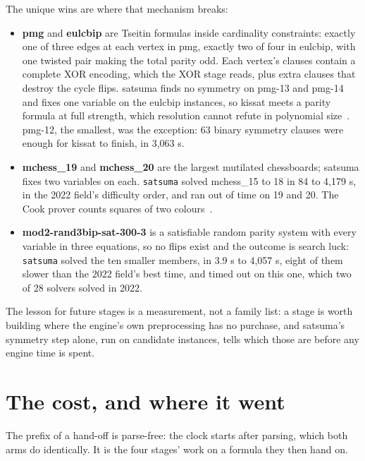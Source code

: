 \documentclass[10pt]{article}
\newcommand{\sats}{\texttt{satsuma}}
\begin{document}
The unique wins are where that mechanism breaks:
\begin{itemize}
\item \textbf{pmg} and \textbf{eulcbip} are Tseitin formulas inside
  cardinality constraints: exactly one of three edges at each vertex in
  pmg, exactly two of four in eulcbip, with one twisted pair making the
  total parity odd. Each vertex's clauses contain a complete XOR encoding,
  which the XOR stage reads, plus extra clauses that destroy the cycle
  flips. satsuma finds no symmetry on pmg-13 and pmg-14 and fixes one
  variable on the eulcbip instances, so kissat meets a parity formula at
  full strength, which resolution cannot refute in polynomial
  size~\cite{urquhart87}. pmg-12, the smallest, was the exception: 63
  binary symmetry clauses were enough for kissat to finish, in 3,063 s.
\item \textbf{mchess\_19} and \textbf{mchess\_20} are the largest
  mutilated chessboards; satsuma fixes two variables on each. \sats{}
  solved mchess\_15 to 18 in 84 to 4,179 s, in the 2022 field's difficulty
  order, and ran out of time on 19 and 20. The Cook prover counts squares
  of two colours~\cite{cook76}.
\item \textbf{mod2-rand3bip-sat-300-3} is a satisfiable random parity
  system with every variable in three equations, so no flips exist and the
  outcome is search luck: \sats{} solved the ten smaller members, in 3.9 s
  to 4,057 s, eight of them slower than the 2022 field's best time, and
  timed out on this one, which two of 28 solvers solved in 2022.
\end{itemize}

The lesson for future stages is a measurement, not a family list: a
stage is worth building where the engine's own preprocessing has no
purchase, and satsuma's symmetry step alone, run on candidate instances,
tells which those are before any engine time is spent.

\section{The cost, and where it went}
\label{sec:cost}

The prefix of a hand-off is parse-free: the clock starts after parsing,
which both arms do identically. It is the four stages' work on a formula
they then hand on.
\end{document}
